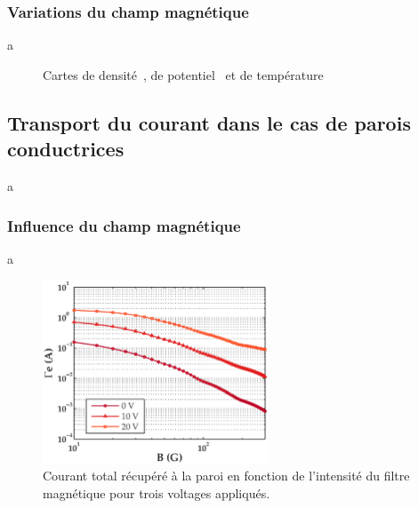 \begin{refsection}
	\subsubsection{Variations du champ magnétique}

a
	
	\begin{figure}[htbp]
  \centering
    \caption{Cartes de densité~, de
    potentiel~ et de
    température}
    \label{pandas}
\end{figure}
\subsection{Transport du courant dans le cas de parois conductrices}

a
	
	\subsubsection{Influence du champ magnétique}
	a
	
\begin{figure}[htbp]
	\centering
	\includegraphics[width=0.6\textwidth]{figures/4-pegasesVarMagCourantParoi.eps}
	{\caption{Courant total récupéré à la paroi en fonction de l'intensité du
	filtre magnétique pour trois voltages appliqués. }
	\label{pegasesVarMagCourantParoi}}
	\end{figure}
	

\end{refsection}
